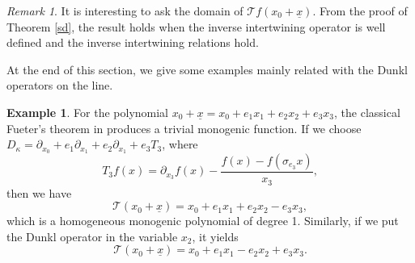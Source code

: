 \documentclass{amsart}
\theoremstyle{definition}
\newtheorem{ex}[theorem]{Example}
\newtheorem{proposition}[theorem]{Proposition}
\theoremstyle{remark}
\newtheorem{remark}[theorem]{Remark}
\numberwithin{equation}{section}
\begin{document}
\begin{remark} It is interesting to ask the domain of $ \mathcal{T}f(x_{0}+\underline{x})$. From the proof of Theorem \ref{sd}, the result holds when the inverse intertwining operator is well defined and the  inverse intertwining relations hold.

\end{remark}
At the end of this section, we give some examples mainly related with the Dunkl operators on the line.
\begin{ex} For the polynomial $x_{0}+\underline{x}=x_{0}+e_{1}x_{1}+e_{2}x_{2}+e_{3}x_{3}$, the classical Fueter's theorem in \cite{sce} produces a trivial monogenic function.
 If we choose $D_{\kappa}=\partial_{x_{0}}+e_{1}\partial_{x_{1}}+e_{2}\partial_{x_{1}}+e_{3}T_{3}$, where
\begin{equation}\label{pq1}
    T_{3}f(x)=\partial_{x_{3}}f(x)-\frac{f(x)-f(\sigma_{e_{3}}x)}{x_{3}},
\end{equation} then we have
 \begin{equation*}
     \mathcal{T}(x_{0}+\underline{x})=x_{0}+e_{1}x_{1}+e_{2}x_{2}-e_{3}x_{3},
 \end{equation*}
 which is a homogeneous monogenic polynomial of degree 1.
Similarly, if we put the Dunkl operator in the variable $x_{2}$, it yields
\begin{equation*}
      \mathcal{T}(x_{0}+\underline{x})=x_{0}+e_{1}x_{1}-e_{2}x_{2}+e_{3}x_{3}.
 \end{equation*}
\end{ex}
\end{document}

